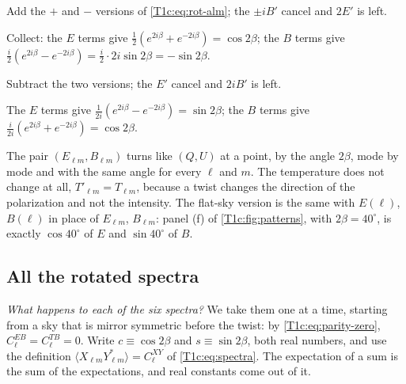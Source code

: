\begin{explain}
  \item Add the $+$ and $-$ versions of \eqref{T1c:eq:rot-alm}; the $\pm iB'$ cancel and $2E'$ is left.
  \item Collect: the $E$ terms give $\frac12(e^{2i\beta}+e^{-2i\beta})=\cos2\beta$; the $B$ terms give $\frac i2(e^{2i\beta}-e^{-2i\beta})=\frac i2\cdot2i\sin2\beta=-\sin2\beta$.
  \item Subtract the two versions; the $E'$ cancel and $2iB'$ is left.
  \item The $E$ terms give $\frac1{2i}(e^{2i\beta}-e^{-2i\beta})=\sin2\beta$; the $B$ terms give $\frac{i}{2i}(e^{2i\beta}+e^{-2i\beta})=\cos2\beta$.
\end{explain}
The pair $(E_{\ell m},B_{\ell m})$ turns like $(Q,U)$ at a point, by the angle $2\beta$, mode by mode and with the same angle for every $\ell$ and $m$. The temperature does not change at all, $T'_{\ell m}=T_{\ell m}$, because a twist changes the direction of the polarization and not the intensity. The flat-sky version is the same with $E(\bm\ell)$, $B(\bm\ell)$ in place of $E_{\ell m}$, $B_{\ell m}$: panel (f) of \cref{T1c:fig:patterns}, with $2\beta=40^\circ$, is exactly $\cos40^\circ$ of $E$ and $\sin40^\circ$ of $B$.

\subsection{All the rotated spectra}
\label{T1c:sec:rot-spectra}

\emph{What happens to each of the six spectra?} We take them one at a time, starting from a sky that is mirror symmetric before the twist: by \eqref{T1c:eq:parity-zero}, $C_\ell^{EB}=C_\ell^{TB}=0$. Write $c\equiv\cos2\beta$ and $s\equiv\sin2\beta$, both real numbers, and use the definition $\langle X_{\ell m}Y^*_{\ell m}\rangle=C_\ell^{XY}$ of \eqref{T1c:eq:spectra}. The expectation of a sum is the sum of the expectations, and real constants come out of it.

